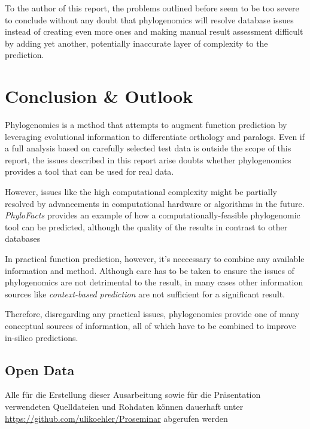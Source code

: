 \documentclass[pdftex,paper=A4,DIV=calc,titlepage,12pt]{scrartcl}
\newtheorem[L]{boxedDefinition}{Definition}
\begin{document}
To the author of this report, the problems outlined before seem to be too severe to conclude without any doubt that phylogenomics will resolve database issues instead of creating even more ones and making manual result assessment difficult by adding yet another, potentially inaccurate layer of complexity to the prediction.

\section{Conclusion \& Outlook}

Phylogenomics is a method that attempts to augment function prediction by leveraging evolutional information to differentiate orthology and paralogs. Even if a full analysis based on carefully selected test data is outside the scope of this report, the issues described in this report arise doubts whether phylogenomics provides a tool that can be used for real data.

However, issues like the high computational complexity might be partially resolved by advancements in computational hardware or algorithms in the future. \textit{PhyloFacts} provides an example of how a computationally-feasible phylogenomic tool can be predicted, although the quality of the results in contrast to other databases

In practical function prediction, however, it's neccessary to combine any available information and method. Although care has to be taken to ensure the issues of phylogenomics are not detrimental to the result, in many cases other information sources like \textit{context-based prediction} are not sufficient for a significant result.

Therefore, disregarding any practical issues, phylogenomics provide one of many conceptual sources of information, all of which have to be combined to improve in-silico predictions.

\renewcommand\refname{Bibliography}


\subsection*{Open Data}\label{opendata}
Alle für die Erstellung dieser Ausarbeitung sowie für die Präsentation verwendeten Quelldateien und Rohdaten können dauerhaft unter \url{https://github.com/ulikoehler/Proseminar} abgerufen werden
\end{document}
